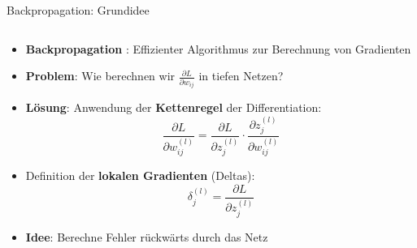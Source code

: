 \documentclass[aspectratio=1610, xcolor=dvipsnames, 9pt]{beamer}
\begin{document}
      \begin{frame}{Backpropagation: Grundidee}
        \begin{columns}
          \begin{column}{1\textwidth}
            \begin{itemize}
              \item \textbf{Backpropagation} \cite{rumelhart1986}: Effizienter Algorithmus zur Berechnung von Gradienten
              \item \textbf{Problem}: Wie berechnen wir $\frac{\partial L}{\partial w_{ij}}$ in tiefen Netzen?
              \item \textbf{Lösung}: Anwendung der \textbf{Kettenregel} der Differentiation:
              \begin{equation}
                \frac{\partial L}{\partial w_{ij}^{(l)}} = \frac{\partial L}{\partial z_j^{(l)}} \cdot \frac{\partial z_j^{(l)}}{\partial w_{ij}^{(l)}}
              \end{equation}
              \item Definition der \textbf{lokalen Gradienten} (Deltas):
              \begin{equation}
                \delta_j^{(l)} = \frac{\partial L}{\partial z_j^{(l)}}
              \end{equation}
              \item \textbf{Idee}: Berechne Fehler rückwärts durch das Netz
            \end{itemize}
          \end{column}
        \end{columns}
      \end{frame}
\end{document}
